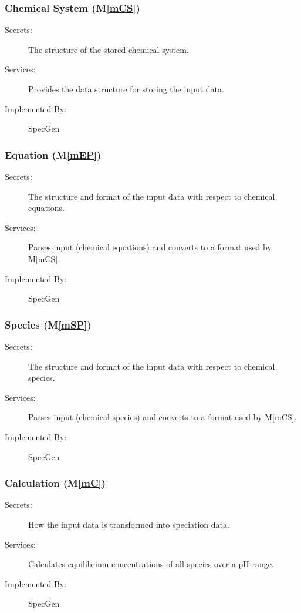 \documentclass[12pt, titlepage]{article}
\newcommand{\mref}[1]{M\ref{#1}}
\newcommand{\progname}{SpecGen}
\begin{document}
\subsubsection{Chemical System (\mref{mCS})}

\begin{description}
\item[Secrets:]The structure of the stored chemical system.
\item[Services:]Provides the data structure for storing the input data.
\item[Implemented By:] \progname{}
\end{description}

\subsubsection{Equation (\mref{mEP})}

\begin{description}
\item[Secrets:]The structure and format of the input data with respect to 
chemical equations.
\item[Services:]Parses input (chemical equations) and converts to a format
  used by \mref{mCS}.
\item[Implemented By:] \progname{}
\end{description}

\subsubsection{Species (\mref{mSP})}

\begin{description}
\item[Secrets:]The structure and format of the input data with respect to 
chemical species.
\item[Services:]Parses input (chemical species) and converts to a format
  used by \mref{mCS}.
\item[Implemented By:] \progname{}
\end{description}

\subsubsection{Calculation (\mref{mC})}

\begin{description}
\item[Secrets:]How the input data is transformed into speciation data.
\item[Services:]Calculates equilibrium concentrations of all species over
  a pH range.
\item[Implemented By:] \progname{}
\end{description}
\end{document}
